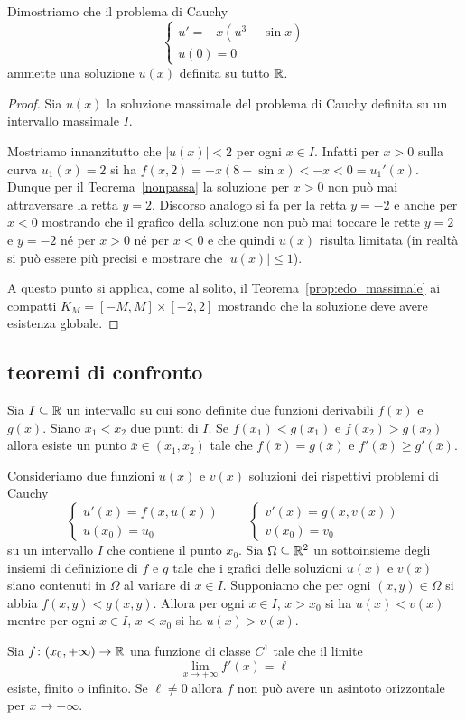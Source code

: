 \begin{example}
Dimostriamo che il problema di Cauchy
\[
\begin{cases}
	u' = -x(u^3 - \sin x) \\
	u(0) = 0
\end{cases}
\]
ammette una soluzione $u(x)$ definita su tutto ${\mathbb R}$.
\end{example}
%
\begin{proof}
Sia $u(x)$ la soluzione massimale del problema di Cauchy
definita su un intervallo massimale $I$.

Mostriamo innanzitutto che $\vert u(x) \vert < 2$ per ogni $x\in
I$.
Infatti per $x>0$ sulla curva $u_1(x)=2$ si ha $f(x,2) = -x
(8-\sin x) < -x < 0 = u_1'(x)$.
Dunque per il Teorema~\ref{nonpassa} la
soluzione per $x>0$ non può mai attraversare la retta
$y=2$.
Discorso analogo si fa per la retta $y=-2$ e anche per $x<0$
mostrando che il grafico della  soluzione non può mai toccare le
rette $y=2$ e $y=-2$ né per $x>0$ né per $x<0$
e che quindi $u(x)$ risulta limitata (in realtà si
può essere più precisi e mostrare che $\vert u(x)\vert \le 1$).

A questo punto si applica, come al solito, il Teorema~\ref{prop:edo_massimale} ai
compatti $K_M=[-M,M]\times[-2,2]$ mostrando che la soluzione deve
avere esistenza globale.
\end{proof}

\subsection{teoremi di confronto}

\begin{theorem}
Sia $I\subseteq {\mathbb R}$ un intervallo su cui sono definite due funzioni derivabili
$f(x)$ e $g(x)$.
Siano $x_1<x_2$ due punti di $I$. Se $f(x_1)<g(x_1)$ e $f(x_2)>g(x_2)$
allora esiste un punto $\bar x \in (x_1,x_2)$ tale che $f(\bar
x)=g(\bar x)$ e $f'(\bar x)\ge g'(\bar x)$.
\end{theorem}

\begin{theorem}
Consideriamo due funzioni $u(x)$ e $v(x)$ soluzioni dei rispettivi
problemi di Cauchy
\[
\begin{cases}
  u'(x)  = f(x,u(x))\\
  u(x_0) = u_0
\end{cases}
\qquad
\begin{cases}
  v'(x) = g(x,v(x))\\
  v(x_0) = v_0
\end{cases}
\]
su un intervallo $I$ che contiene il punto $x_0$.
Sia $\Omega\subseteq {\mathbb R}^2$ un sottoinsieme degli insiemi di definizione
di $f$ e $g$ tale che i grafici delle soluzioni $u(x)$ e $v(x)$ siano
contenuti in $\Omega$ al variare di $x\in I$.
Supponiamo che per ogni $(x,y)\in\Omega$ si abbia $f(x,y)<g(x,y)$.
Allora per ogni $x\in I$, $x> x_0$ si ha $u(x)< v(x)$ mentre per ogni
$x\in I$, $x<x_0$ si ha $u(x)>v(x)$.
\end{theorem}

\begin{theorem}
Sia $f\colon (x_0,+\infty)\to {\mathbb R}$ una funzione di classe
$C^1$ tale
che il limite
\[
  \lim_{x\to +\infty} f'(x) = \ell
\]
esiste, finito o infinito. Se $\ell\neq 0$ allora $f$ non può avere
un asintoto orizzontale per $x\to +\infty$.
\end{theorem}
